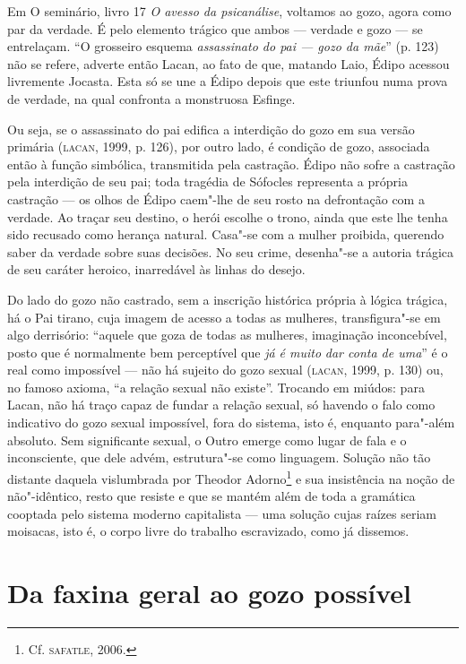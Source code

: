 Em O seminário, livro 17 \emph{O avesso da psicanálise}, voltamos ao
gozo, agora como par da verdade. É pelo elemento trágico que ambos ---
verdade e gozo --- se entrelaçam. ``O grosseiro esquema \emph{assassinato
do pai --- gozo da mãe}'' (p. 123) não se refere, adverte então Lacan, ao
fato de que, matando Laio, Édipo acessou livremente Jocasta. Esta só se
une a Édipo depois que este triunfou numa prova de verdade, na qual
confronta a monstruosa Esfinge.

Ou seja, se o assassinato do pai edifica a interdição do gozo em sua
versão primária (\textsc{lacan}, 1999, p. 126), por outro lado, é condição
de gozo, associada então à função
simbólica, transmitida pela castração. Édipo não sofre a castração pela
interdição de seu pai; toda tragédia de Sófocles representa a própria
castração --- os olhos de Édipo caem"-lhe de seu rosto na defrontação com
a verdade. Ao traçar seu destino, o herói escolhe o trono, ainda que
este lhe tenha sido recusado como herança natural. Casa"-se com a mulher
proibida, querendo saber da verdade sobre suas decisões. No seu crime,
desenha"-se a autoria trágica de seu caráter heroico, inarredável às
linhas do desejo.

Do lado do gozo não castrado, sem a inscrição histórica própria à lógica
trágica, há o Pai tirano, cuja imagem de acesso a todas as mulheres,
transfigura"-se em algo derrisório: ``aquele que goza de todas as
mulheres, imaginação inconcebível, posto que é normalmente bem
perceptível que \emph{já é muito} \emph{dar conta de uma}'' é o real
como impossível --- não há sujeito do gozo sexual (\textsc{lacan}, 1999, p.
130) ou, no famoso axioma, ``a relação sexual não existe''. Trocando em
miúdos: para Lacan, não há traço capaz de fundar a relação sexual, só
havendo o falo como indicativo do gozo sexual impossível, fora do
sistema, isto é, enquanto para"-além absoluto. Sem significante sexual, o
Outro emerge como lugar de fala e o inconsciente, que dele advém,
estrutura"-se como linguagem. Solução não tão distante daquela
vislumbrada por Theodor Adorno\footnote{Cf. \textsc{safatle}, 2006.} e sua
insistência na noção de não"-idêntico, resto que resiste e que se mantém
além de toda a gramática cooptada pelo sistema moderno capitalista ---
uma solução cujas raízes seriam moisacas, isto é, o corpo livre do
trabalho escravizado, como já dissemos.

\section{Da faxina geral ao gozo possível}


